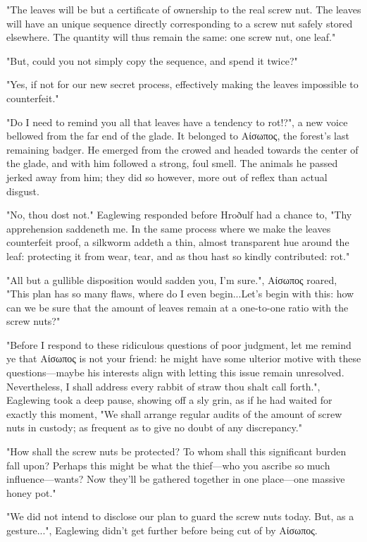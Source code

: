 "The leaves will be but a certificate of ownership to the real screw nut. The leaves will have an unique sequence directly corresponding to a screw nut safely stored elsewhere. The quantity will thus remain the same: one screw nut, one leaf."

"But, could you not simply copy the sequence, and spend it twice?"

"Yes, if not for our new secret process, effectively making the leaves impossible to counterfeit."

"Do I need to remind you all that leaves have a tendency to rot!?", a new voice bellowed from the far end of the glade. It belonged to Αίσωπος, the forest's last remaining badger. He emerged from the crowed and headed towards the center of the glade, and with him followed a strong, foul smell. The animals he passed jerked away from him; they did so however, more out of reflex than actual disgust.

"No, thou dost not." Eaglewing responded before Hroðulf had a chance to, "Thy apprehension saddeneth me. In the same process where we make the leaves counterfeit proof, a silkworm addeth a thin, almost transparent hue around the leaf: protecting it from wear, tear, and as thou hast so kindly contributed: rot."

"All but a gullible disposition would sadden you, I'm sure.", Αίσωπος roared, "This plan has so many flaws, where do I even begin...Let's begin with this: how can we be sure that the amount of leaves remain at a one-to-one ratio with the screw nuts?" 

"Before I respond to these ridiculous questions of poor judgment, let me remind ye that Αίσωπος is not your friend: he might have some ulterior motive with these questions---maybe his interests align with letting this issue remain unresolved.
Nevertheless, I shall address every rabbit of straw thou shalt call forth.", Eaglewing took a deep pause, showing off a sly grin, as if he had waited for exactly this moment, "We shall arrange regular audits of the amount of screw nuts in custody; as frequent as to give no doubt of any discrepancy."

"How shall the screw nuts be protected? To whom shall this significant burden fall upon? Perhaps this might be what the thief---who you ascribe so much influence---wants? Now they'll be gathered together in one place---one massive honey pot."

"We did not intend to disclose our plan to guard the screw nuts today. But, as a gesture...", Eaglewing didn't get further before being cut of by Αίσωπος.

